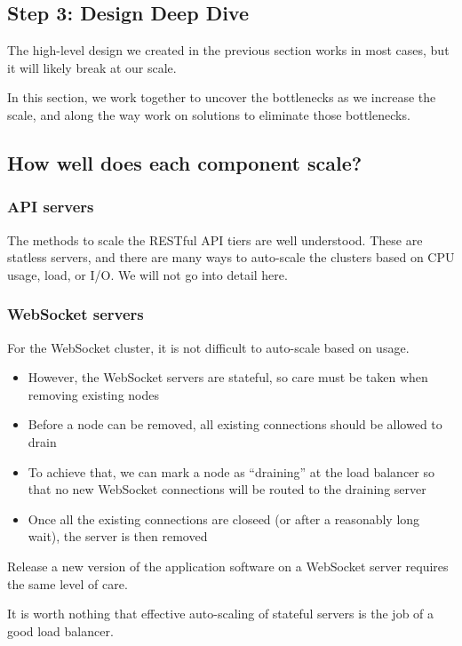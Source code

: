 \documentclass{report}
\theoremstyle{definition}
\let\oldsubsection\subsection
\let\oldsubsubsection\subsubsection
\renewcommand{\subsection}{\oldsubsection*}
\renewcommand{\subsubsection}{\oldsubsubsection*}
\begin{document}
\subsection{Step 3: Design Deep Dive}

The high-level design we created in the previous section works in most cases, but it will likely break at our scale.

In this section, we work together to uncover the bottlenecks as we increase the scale, and along the way work on solutions to
eliminate those bottlenecks.

\subsection{How well does each component scale?}

\subsubsection{API servers}

The methods to scale the RESTful API tiers are well understood. These are statless servers, and there are many ways to auto-scale the
clusters based on CPU usage, load, or I/O. We will not go into detail here.

\subsubsection{WebSocket servers}

For the WebSocket cluster, it is not difficult to auto-scale based on usage.

\begin{itemize}
\item
However, the WebSocket servers are stateful, so care must be taken when removing existing nodes
\item
Before a node can be removed, all existing connections should be allowed to drain
\item
To achieve that, we can mark a node as ``draining'' at the load balancer so that no new WebSocket connections will be routed to the draining server
\item
Once all the existing connections are closeed (or after a reasonably long wait), the server is then removed
\end{itemize}

Release a new version of the application software on a WebSocket server requires the same level of care.

It is worth nothing that effective auto-scaling of stateful servers is the job of a good load balancer.
\end{document}
